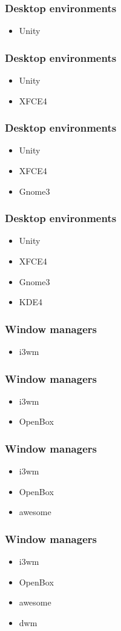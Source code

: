 \begin{frame}
    \frametitle{Desktop environments}
    \begin{itemize}
        \item Unity
    \end{itemize}
\end{frame}
\begin{frame}
    \frametitle{Desktop environments}
    \begin{itemize}
        \item Unity
        \item XFCE4
    \end{itemize}
\end{frame}
\begin{frame}
    \frametitle{Desktop environments}
    \begin{itemize}
        \item Unity
        \item XFCE4
        \item Gnome3
    \end{itemize}
\end{frame}
\begin{frame}
    \frametitle{Desktop environments}
    \begin{itemize}
        \item Unity
        \item XFCE4
        \item Gnome3
        \item KDE4
    \end{itemize}
\end{frame}
\begin{frame}
    \frametitle{Window managers}
    \begin{itemize}
        \item i3wm
    \end{itemize}
\end{frame}
\begin{frame}
    \frametitle{Window managers}
    \begin{itemize}
        \item i3wm
        \item OpenBox
    \end{itemize}
\end{frame}
\begin{frame}
    \frametitle{Window managers}
    \begin{itemize}
        \item i3wm
        \item OpenBox
        \item awesome
    \end{itemize}
\end{frame}
\begin{frame}
    \frametitle{Window managers}
    \begin{itemize}
        \item i3wm
        \item OpenBox
        \item awesome
        \item dwm
    \end{itemize}
\end{frame}
